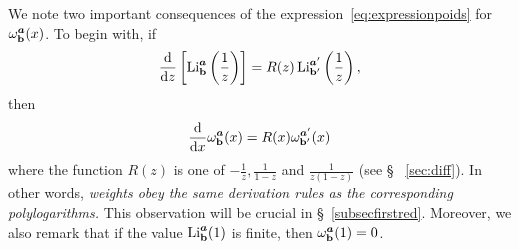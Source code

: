 \documentclass[reqno,12pt]{amsart}
\numberwithin{equation}{section}
\theoremstyle{remark}
\def\om{\omega}
\def\li{\operatorname{Li}}
\def\dd{\textup{d}}
\begin{document}
\medskip


We note two important consequences of the expression~\eqref{eq:expressionpoids} 
for $\om_{{\bf b}}^{\boldsymbol{a}}(x)$. To begin with,  if 
$$
\frac{\dd }{\dd z}\left[\li_{{\bf b}}^{\boldsymbol{a}}\left(\frac1z\right)\right] 
= R(z)\li_{{\bf b}'}^{\boldsymbol{a}'}\left(\frac1z\right), 
$$
then
$$
\frac{\dd }{\dd x}\om_{{\bf b}}^{\boldsymbol{a}}(x) 
= R(x)\om_{{\bf b}'}^{\boldsymbol{a}'}(x)
$$
where the function $R(z)$ is one of $\displaystyle -\frac{1}{z},\frac{1}{1-z}$ and  
$\displaystyle \frac{1}{z(1-z)}$ (see \S~ \ref{sec:diff}). In other words, {\em weights obey the same 
derivation  rules as the corresponding polylogarithms.} This observation will be crucial 
in \S~\ref{subsecfirstred}. Moreover, we also remark that  if 
the value $\li_{{\bf b}}^{\boldsymbol{a}}(1)$ is finite, then 
$\om_{{\bf b}}^{\boldsymbol{a}}(1)=0$. 
\end{document}
